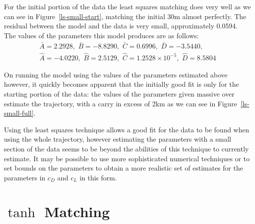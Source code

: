 For the initial portion of the data the least squares matching does very well as we can see in Figure~\ref{ls-small-start}, 
matching the initial
30m almost perfectly. The residual between the model and the data is very small, approximately 0.0594.
The values of the parameters this model produces are as follows:
\begin{gather*}
\bar{A} = 2.2928, \,\, \bar{B} = -8.8290, \,\, \bar{C} = 0.6996, \,\, \bar{D} = -3.5440, \\
\hat{A} = -4.0220, \,\, \hat{B} = 2.5129, \,\, \hat{C} = 1.2528\times10^{-5}, \,\, \hat{D} = 8.5804
\end{gather*}

On running the model using the values of the parameters estimated above however, it quickly becomes
apparent that the initially good fit is only for the starting portion of the data: the values of the
parameters given massive over estimate the trajectory, with a carry in excess of 2km as we can see in
Figure~\ref{ls-small-full}.

Using the least squares technique allows a good fit for the data to be found when using the whole trajectory,
however estimating the parameters with a small section of the data seems to be beyond the abilities 
of this technique to currently estimate. It may be possible to use more sophisticated numerical techniques
or to set bounds on the parameters to obtain a more realistic set of estimates for the parameters in
$c_D$ and $c_L$ in this form.


\section{$\tanh$ Matching}


